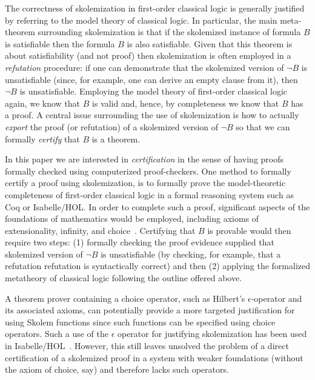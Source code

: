 \documentclass[a4paper,USenglish]{lipics-v2018}
\begin{document}
The correctness of skolemization in first-order classical logic
is generally justified by referring to the model theory of classical
logic.
%
In particular, the main meta-theorem surrounding skolemization is that
if the skolemized instance of formula $B$ is satisfiable then
the formula $B$ is also satisfiable.
%
Given that this theorem is about satisfiability (and not proof) then
skolemization is often employed in a \emph{refutation} procedure: if
one can demonstrate that the skolemized version of $\neg B$ is
unsatisfiable (since, for example, one can derive an empty clause from
it), then $\neg B$ is unsatisfiable.
%
Employing the model theory of first-order classical logic again, we
know that $B$ is valid and, hence, by completeness we know that $B$
has a proof.
%
A central issue surrounding the use of skolemization is how to
actually \emph{export} the proof (or refutation) of a skolemized
version of $\neg B$ so that we can formally \emph{certify} that $B$ is
a theorem.


%
In this paper we are interested in \emph{certification} in the sense
of having proofs formally checked using computerized proof-checkers.
%
One method to formally certify a proof using skolemization, is to
formally prove the model-theoretic completeness of first-order
classical logic in a formal reasoning system such as Coq or
Isabelle/HOL.
%
In order to complete such a proof, significant aspects of the
foundations of mathematics would be employed, including axioms of
extensionality, infinity, and choice~\cite{church40}.
%
Certifying that $B$ is provable would then require two steps: (1)
formally checking the proof evidence supplied that skolemized version
of $\neg B$ is unsatisfiable (by checking, for example, that a
refutation refutation is syntactically correct) and then (2) applying
the formalized metatheory of classical logic following the outline
offered above.

%
A theorem prover containing a choice operator, such as Hilbert's
$\epsilon$-operator and its associated axioms, can potentially provide
a more targeted justification for using Skolem functions since such
functions can be specified using choice operators.
%
Such a use of the $\epsilon$ operator for justifying skolemization has
been used in Isabelle/HOL~\cite{barbosa17cade}.
%
However, this still leaves unsolved the problem of a direct
certification of a skolemized proof in a system with weaker
foundations (without the axiom of choice, say) and therefore lacks
such operators.
\end{document}
